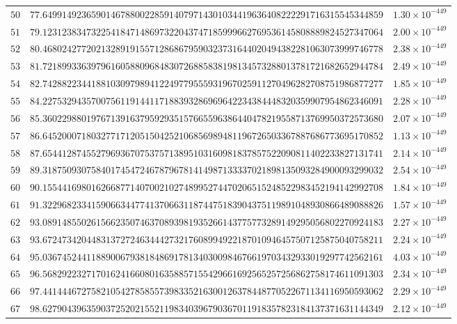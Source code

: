 \documentclass[12pt,reqno]{amsart}
\theoremstyle{remark}
\begin{document}
\begin{longtable}{clc}
$50$ & $77.6499149236590146788002285914079714301034419636408222291716315545344859$ & $1.30\times 10^{-449}$ \\
$51$ & $79.1231238347322541847148697322043747185999662769536145808889824527347064$ & $2.00\times 10^{-449}$ \\
$52$ & $80.4680242772021328919155712868679590323731644020494382281063073999746778$ & $2.38\times 10^{-449}$ \\
$53$ & $81.7218993363979616058809684830726885838198134573288013781721682652944784$ & $2.49\times 10^{-449}$ \\
$54$ & $82.7428822344188103097989412249779555931967025911270496282708751986877277$ & $1.85\times 10^{-449}$ \\
$55$ & $84.2275329435700756119144117188393286969642234384448320359907954862346091$ & $2.28\times 10^{-449}$ \\
$56$ & $85.3602298801976713916379592935157665596386440478219558713769950372573680$ & $2.07\times 10^{-449}$ \\
$57$ & $86.6452000718032771712051504252106856989481196726503367887686773695170852$ & $1.13\times 10^{-449}$ \\
$58$ & $87.6544128745527969367075375713895103160981837857522090811402233827131741$ & $2.14\times 10^{-449}$ \\
$59$ & $89.3187509307584017454724678796781414987133337021898135093284900093299032$ & $2.54\times 10^{-449}$ \\
$60$ & $90.1554416980162668771407002102748995274470206515248522983452194142992708$ & $1.84\times 10^{-449}$ \\
$61$ & $91.3229682334159066344774137066311874475183904375119891048930866489088826$ & $1.57\times 10^{-449}$ \\
$62$ & $93.0891485502615662350746370893981935266143775773289149295056802270924183$ & $2.27\times 10^{-449}$ \\
$63$ & $93.6724734204483137272463444273217608994922187010946457507125875040758211$ & $2.24\times 10^{-449}$ \\
$64$ & $95.0367452441188900679381848691781340300984676619703432933019297742562161$ & $4.03\times 10^{-449}$ \\
$65$ & $96.5682922327170162416608016358857155429661692565257256862758174611091303$ & $2.34\times 10^{-449}$ \\
$66$ & $97.4414446727582105427858557398335216300126378448770522671134116950593062$ & $2.29\times 10^{-449}$ \\
$67$ & $98.6279043963590372520215521198340396790367011918357823184137371631144349$ & $2.12\times 10^{-449}$ \\

\end{longtable}
\end{document}
